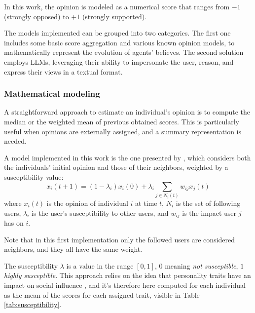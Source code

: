 In this work, the opinion is modeled as a numerical score that ranges from $-1$ (strongly opposed) to $+1$ (strongly supported).

The models implemented can be grouped into two categories.
The first one includes some basic score aggregation and various known opinion models, to mathematically represent the evolution of agents' believes.
The second solution employs LLMs, leveraging their ability to impersonate the user, reason, and express their views in a textual format.


\subsubsection{Mathematical modeling}
A straightforward approach to estimate an individual's opinion is to compute the median or the weighted mean of previous obtained scores.
This is particularly useful when opinions are externally assigned, and a summary representation is needed.

\medskip
A model implemented in this work is the one presented by \citet{friedkin_1990}, which considers both the individuals' initial opinion and those of their neighbors, weighted by a susceptibility value:
\[
x_i(t + 1) = (1 - \lambda_i) x_i(0) + \lambda_i   \sum_{j \in N_i(t)} w_{ij} x_j(t)
\]
where $x_i(t)$ is the opinion of individual $i$ at time $t$, $N_i$ is the set of following users, $\lambda_i$ is the user's susceptibility to other users, and $w_{ij}$ is the impact user $j$ has on $i$. 

Note that in this first implementation only the followed users are considered neighbors, and they all have the same weight.

The susceptibility $\lambda$ is a value in the range $[0,1]$, $0$ meaning \textit{not susceptible}, $1$ \textit{highly susceptible}.
This approach relies on the idea that personality traits have an impact on social influence \cite{oyibo2019personality}, and it's therefore here computed for each individual as the mean of the scores for each assigned trait, visible in Table \ref{tab:susceptibility}.

